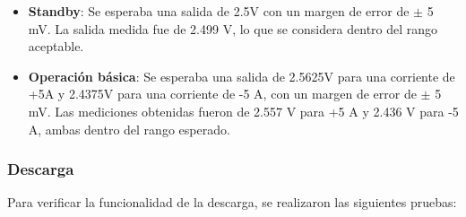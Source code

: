 \begin{itemize}
	\item \textbf{Standby}: Se esperaba una salida de 2.5V con un margen de error de $\pm$ 5 mV. La salida medida fue de 2.499 V, lo que se considera dentro del rango aceptable.
	
	\item \textbf{Operación básica}: Se esperaba una salida de 2.5625V para una corriente de +5A y 2.4375V para una corriente de -5 A, con un margen de error de $\pm$ 5 mV. Las mediciones obtenidas fueron de 2.557 V para +5 A y 2.436 V para -5 A, ambas dentro del rango esperado.
\end{itemize}	


\subsubsection{Descarga}

Para verificar la funcionalidad de la descarga, se realizaron las siguientes pruebas:

